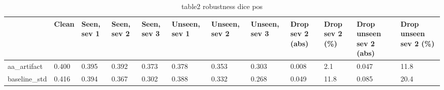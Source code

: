\begin{table}
\caption{table2 robustness dice pos}
\label{tab:table2_robustness_dice_pos}
\begin{tabular}{llllllllllll}
\toprule
 & Clean & Seen, sev 1 & Seen, sev 2 & Seen, sev 3 & Unseen, sev 1 & Unseen, sev 2 & Unseen, sev 3 & Drop sev 2 (abs) & Drop sev 2 (\%) & Drop unseen sev 2 (abs) & Drop unseen sev 2 (\%) \\
\midrule
aa\_artifact & 0.400 & 0.395 & 0.392 & 0.373 & 0.378 & 0.353 & 0.303 & 0.008 & 2.1 & 0.047 & 11.8 \\
baseline\_std & 0.416 & 0.394 & 0.367 & 0.302 & 0.388 & 0.332 & 0.268 & 0.049 & 11.8 & 0.085 & 20.4 \\
\bottomrule
\end{tabular}
\end{table}

